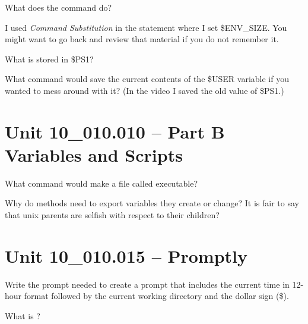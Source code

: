 \documentclass[letterpaper,12pt]{exam}
\newcommand{\unit}{Unit 10}
\begin{document}
\begin {questions}
\begin{samepage}
\question What does the  command do? 
\vspace{5mm}
\end{samepage}

\noindent I used \textit{Command Substitution} in the statement where I set \$ENV\_SIZE.   You might want to go back and review that material if you do not remember it.

\begin{samepage}
\question What is stored in \$PS1? 
\vspace{5mm}
\end{samepage}

\begin{samepage}
\question What command would save the current contents of the \$USER variable if you wanted to mess around with it? (In the video I saved the old value of \$PS1.) 
\vspace{5mm}
\end{samepage}

\section*{\unit\_010.010 -- Part B Variables and Scripts}

\begin{samepage}
\question What command would make a file called  executable? 
\vspace{5mm}
\end{samepage}

\begin{samepage}
\question Why do methods need to export variables they create or change?  It is fair to say that unix parents are selfish with respect to their children? 
\vspace{25mm}
\end{samepage}

\section*{\unit\_010.015 -- Promptly}

\begin{samepage}
\question Write the prompt needed to create a prompt that includes the current time in 12-hour format followed by the current working directory and the dollar sign (\$). 
\vspace{5mm}
\end{samepage}

\begin{samepage}
\question What is ? 
\vspace{15mm}
\end{samepage}


\end{questions}
\end{document}
